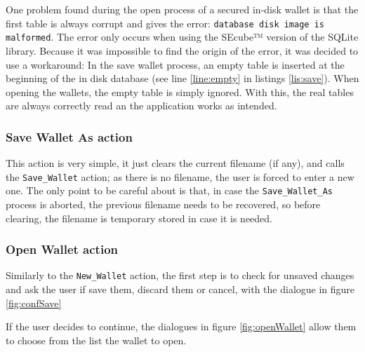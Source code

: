 One problem found during the open process of a secured in-disk wallet is that the first table is always corrupt and gives the error: \texttt{database disk image is malformed}. The error only occurs when using the SEcube™ version of the SQLite library. Because it was impossible to find the origin of the error, it was decided to use a workaround: In the save wallet process, an empty table is inserted at the beginning of the in disk database (see line \ref{line:empty} in listings \ref{lis:save}). When opening the wallets, the empty table is simply ignored. With this, the real tables are always correctly read an the application works as intended.


\subsubsection*{Save Wallet As action}

This action is very simple, it just clears the current filename (if any), and calls the \texttt{Save\_Wallet} action; as there is no filename, the user is forced to enter a new one. The only point to be careful about is that, in case the \texttt{Save\_Wallet\_As} process is aborted, the previous filename needs to be recovered, so before clearing, the filename is temporary stored in case it is needed.

\subsubsection*{Open Wallet action}
Similarly to the \texttt{New\_Wallet} action, the first step is to check for unsaved changes and ask the user if save them, discard them or cancel, with the dialogue in figure \ref{fig:confSave}

If the user decides to continue, the dialogues in figure \ref{fig:openWallet} allow them to choose from the list the wallet to open.

